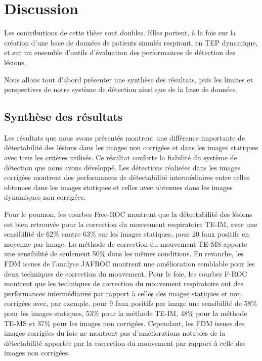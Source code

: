 \chapter{Discussion}

Les contributions de cette thèse sont doubles. Elles portent, à la fois sur la
création d'une base de données de patients simulés respirant, en TEP dynamique, et
sur un ensemble d'outils d'évaluation des performances de détection
des lésions.  
 
Nous allons tout d'abord présenter une synthèse des résultats, puis les limites et perspectives de notre système de détection ainsi que de la base de données.

\section{Synthèse des résultats}

Les résultats que nous avons présentés montrent une différence importante de
détectabilité des lésions dans les images non corrigées et dans les images statiques
avec tous les critères utilisés. Ce résultat conforte la fiabilité du système de
détection que nous avons développé. Les détections réalisées dans les images
corrigées montrent des performances de détectabilité intermédiaires entre celles obtenues dans les images statiques et celles avec obtenues dans les images dynamiques non corrigées. 

Pour le poumon, les courbes Free-ROC montrent que la détectabilité des
lésions est bien retrouvée pour la correction du mouvement respiratoire TE-IM, avec une sensibilité de 62\% contre 63\% sur les images statiques, pour
20 faux positifs en moyenne par image. La méthode de correction du mouvement TE-MS apporte une sensibilité de seulement 50\% dans les mêmes conditions. En revanche, les FDM
issues de l'analyse JAFROC montrent une amélioration semblable pour
les deux techniques de correction du mouvement. Pour le foie, les courbes F-ROC
montrent que les techniques de correction du mouvement respiratoire ont des performances intermédiaires par rapport à celles des images statiques et non
corrigées avec, par exemple, pour 9 faux positifs par image une sensibilité de
58\% pour les images statiques, 53\% pour la méthode TE-IM, 48\% pour la méthode TE-MS et 37\% pour
les images non corrigées. Cependant, les FDM issues des images corrigées du foie
ne montrent pas d'améliorations notables de la détectabilité apportée par la
correction du mouvement par rapport à celle des images non corrigées. 

